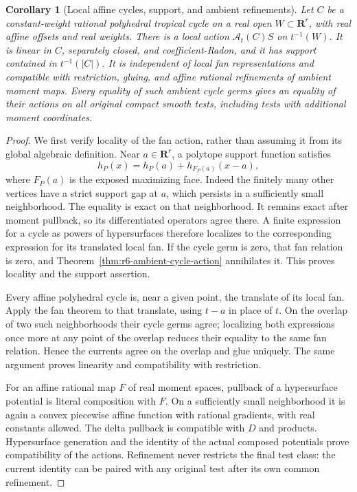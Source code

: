 \documentclass[11pt,a4paper]{article}
\numberwithin{equation}{section}
\newtheorem{corollary}[theorem]{Corollary}
\theoremstyle{definition}
\theoremstyle{remark}
\begin{document}
\begin{corollary}[Local affine cycles, support, and ambient refinements]
\label{cor:r6-ambient-affine-cycle-action}
Let $C$ be a constant-weight rational polyhedral tropical
cycle on a real open $W\subset\mathbf R^r$, with real affine
offsets and real weights. There is a local action
$\mathcal A_t(C)S$ on $t^{-1}(W)$. It is linear in $C$,
separately closed, and coefficient-Radon, and it has support
contained in $t^{-1}(|C|)$. It is independent of local fan
representations and compatible with restriction, gluing,
and affine rational refinements of ambient moment maps.
Every equality of such ambient cycle germs gives an
equality of their actions on all original compact smooth
tests, including tests with additional moment coordinates.
\end{corollary}

\begin{proof}
We first verify locality of the fan action, rather than
assuming it from its global algebraic definition. Near
$a\in\mathbf R^r$, a polytope support function satisfies
\[
 h_P(x)=h_P(a)+h_{F_P(a)}(x-a),
\]
where $F_P(a)$ is the exposed maximizing face. Indeed the
finitely many other vertices have a strict support gap
at $a$, which persists in a sufficiently small neighborhood.
The equality is exact on that neighborhood. It remains
exact after moment pullback, so its differentiated
operators agree there. A finite expression for a cycle
as powers of hypersurfaces therefore localizes to the
corresponding expression for its translated local fan.
If the cycle germ is zero, that fan relation is zero,
and Theorem~\ref{thm:r6-ambient-cycle-action} annihilates it.
This proves locality and the support assertion.

Every affine polyhedral cycle is, near a given point, the
translate of its local fan. Apply the fan theorem to
that translate, using $t-a$ in place of $t$. On the
overlap of two such neighborhoods their cycle germs
agree; localizing both expressions once more at any
point of the overlap reduces their equality to the same
fan relation. Hence the currents agree on the overlap
and glue uniquely. The same argument proves linearity
and compatibility with restriction.

For an affine rational map $F$ of real moment spaces,
pullback of a hypersurface potential is literal composition
with $F$. On a sufficiently small neighborhood it is again
a convex piecewise affine function with rational gradients,
with real constants allowed. The delta pullback is
compatible with $D$ and products. Hypersurface generation
and the identity of the actual composed potentials prove
compatibility of the actions. Refinement never restricts
the final test class: the current identity can be paired
with any original test after its own common refinement.
\end{proof}
\end{document}
